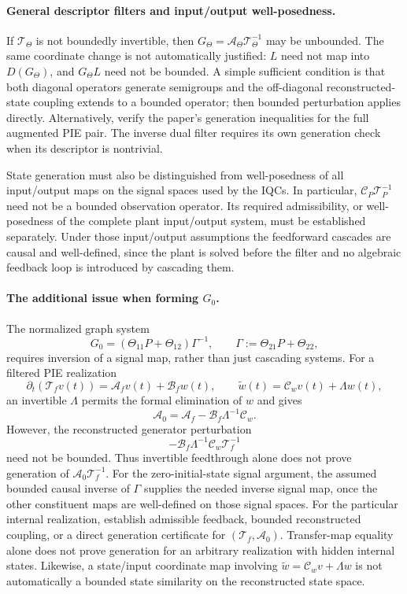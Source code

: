 \documentclass[11pt,a4paper]{article}
\begin{document}
\paragraph{General descriptor filters and input/output well-posedness.}
If $\mathcal T_\Theta$ is not boundedly invertible, then
$G_\Theta=\mathcal A_\Theta\mathcal T_\Theta^{-1}$ may be unbounded.
The same coordinate change is not automatically justified: $L$ need not
map into $D(G_\Theta)$, and $G_\Theta L$ need not be bounded.
A simple sufficient condition is that both diagonal operators generate
semigroups and the off-diagonal reconstructed-state coupling extends to
a bounded operator; then bounded perturbation applies directly.
Alternatively, verify the paper's generation inequalities for the full
augmented PIE pair. The inverse dual filter requires its own generation
check when its descriptor is nontrivial.

State generation must also be distinguished from well-posedness of all
input/output maps on the signal spaces used by the IQCs. In particular,
$\mathcal C_P\mathcal T_P^{-1}$ need not be a bounded observation
operator. Its required admissibility, or well-posedness of the complete
plant input/output system, must be established separately. Under those
input/output assumptions the feedforward cascades are causal and
well-defined, since the plant is solved before the filter and no algebraic
feedback loop is introduced by cascading them.

\paragraph{The additional issue when forming $G_0$.}
The normalized graph system
\[
 G_0=(\Theta_{11}P+\Theta_{12})\Gamma^{-1},
 \qquad\Gamma:=\Theta_{21}P+\Theta_{22},
\]
requires inversion of a signal map, rather than just cascading systems.
For a filtered PIE realization
\[
 \partial_t(\mathcal T_f v(t))
    =\mathcal A_fv(t)+\mathcal B_fw(t),\qquad
 \tilde w(t)=\mathcal C_wv(t)+\Lambda w(t),
\]
an invertible $\Lambda$ permits the formal elimination of $w$ and gives
\[
 \mathcal A_0
   =\mathcal A_f-\mathcal B_f\Lambda^{-1}\mathcal C_w.
\]
However, the reconstructed generator perturbation
\[
 -\mathcal B_f\Lambda^{-1}\mathcal C_w\mathcal T_f^{-1}
\]
need not be bounded. Thus invertible feedthrough alone does not
prove generation of $\mathcal A_0\mathcal T_f^{-1}$.
For the zero-initial-state signal argument, the assumed bounded causal
inverse of $\Gamma$ supplies the needed inverse signal map, once the
other constituent maps are well-defined on those signal spaces.
For the particular internal realization, establish admissible feedback,
bounded reconstructed coupling, or a direct generation certificate for
$(\mathcal T_f,\mathcal A_0)$. Transfer-map equality alone does not
prove generation for an arbitrary realization with hidden internal states.
Likewise, a state/input coordinate map involving
$\tilde w=\mathcal C_wv+\Lambda w$ is not automatically a bounded state
similarity on the reconstructed state space.
\end{document}
